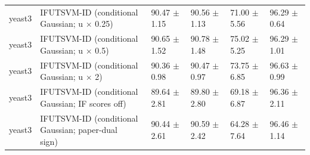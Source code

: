 \begin{table}[!t]
{\begin{tabular}{llllll}
yeast3 & \shortstack[l]{IFUTSVM-ID (conditional\\Gaussian; u \(\times\) 0.25)} & 90.47 \(\pm\) 1.15 & 90.56 \(\pm\) 1.13 & 71.00 \(\pm\) 5.56 & 96.29 \(\pm\) 0.64 \\
yeast3 & \shortstack[l]{IFUTSVM-ID (conditional\\Gaussian; u \(\times\) 0.5)} & 90.65 \(\pm\) 1.52 & 90.78 \(\pm\) 1.48 & 75.02 \(\pm\) 5.25 & 96.29 \(\pm\) 1.01 \\
yeast3 & \shortstack[l]{IFUTSVM-ID (conditional\\Gaussian; u \(\times\) 2)} & 90.36 \(\pm\) 0.98 & 90.47 \(\pm\) 0.97 & 73.75 \(\pm\) 6.85 & 96.63 \(\pm\) 0.99 \\
yeast3 & \shortstack[l]{IFUTSVM-ID (conditional\\Gaussian; IF scores off)} & 89.64 \(\pm\) 2.81 & 89.80 \(\pm\) 2.80 & 69.18 \(\pm\) 6.87 & 96.36 \(\pm\) 2.11 \\
yeast3 & \shortstack[l]{IFUTSVM-ID (conditional\\Gaussian; paper-dual\\sign)} & 90.44 \(\pm\) 2.61 & 90.59 \(\pm\) 2.42 & 64.28 \(\pm\) 7.64 & 96.46 \(\pm\) 1.14 \\
\hline
\end{tabular}%
}
\end{table}

